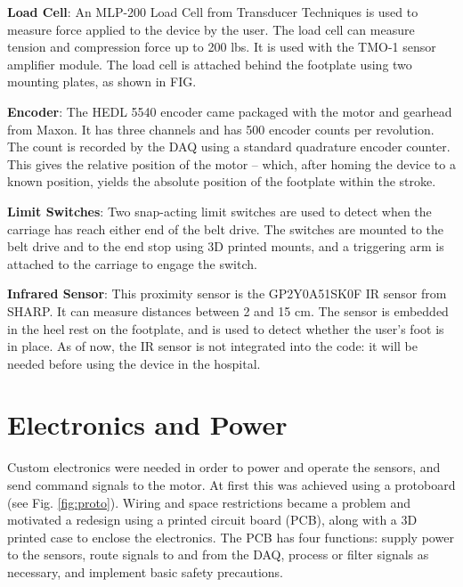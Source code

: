 \documentclass[12pt]{report}
\begin{document}
	\textbf{Load Cell}: An MLP-200 Load Cell from Transducer Techniques is used to measure force applied to the device by the user. The load cell can measure tension and compression force up to 200 lbs. It is used with the TMO-1 sensor amplifier module. The load cell is attached behind the footplate using two mounting plates, as shown in FIG. 
	
	\textbf{Encoder}: The HEDL 5540 encoder came packaged with the motor and gearhead from Maxon. It has three channels and has 500 encoder counts per revolution. The count is recorded by the DAQ using a standard quadrature encoder counter. This gives the relative position of the motor -- which, after homing the device to a known position, yields the absolute position of the footplate within the stroke. 
	
	\textbf{Limit Switches}: Two snap-acting limit switches are used to detect when the carriage has reach either end of the belt drive. The switches are mounted to the belt drive and to the end stop using 3D printed mounts, and a triggering arm is attached to the carriage to engage the switch. 
	
	\textbf{Infrared Sensor}: This proximity sensor is the GP2Y0A51SK0F IR sensor from SHARP. It can measure distances between 2 and 15 cm. The sensor is embedded in the heel rest on the footplate, and is used to detect whether the user's foot is in place. As of now, the IR sensor is not integrated into the code: it will be needed before using the device in the hospital.
	
	
		
	\section{Electronics and Power}
	
	Custom electronics were needed in order to power and operate the sensors, and send command signals to the motor. At first this was achieved using a protoboard (see Fig. \ref{fig:proto}). Wiring and space restrictions became a problem and motivated a redesign using a printed circuit board (PCB), along with a 3D printed case to enclose the electronics. The PCB has four functions: supply power to the sensors, route signals to and from the DAQ, process or filter signals as necessary, and implement basic safety precautions. 
	
\end{document}
